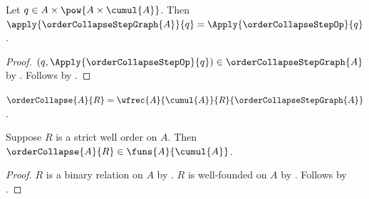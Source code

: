 \begin{proposition}\label{order_collapse_step_graph_application}
    Let $q\in A\times\pow{A\times\cumul{A}}$.
    Then
        $\apply{\orderCollapseStepGraph{A}}{q}
            =\Apply{\orderCollapseStepOp}{q}$.
\end{proposition}
\begin{proof}
    $(q,\Apply{\orderCollapseStepOp}{q})
        \in\orderCollapseStepGraph{A}$
        by
        .
    Follows by
        .
\end{proof}

\begin{definition}\label{order_collapse}
    $\orderCollapse{A}{R}=
        \wfrec{A}{\cumul{A}}{R}{\orderCollapseStepGraph{A}}$.
\end{definition}

\begin{proposition}\label{order_collapse_type}
    Suppose $R$ is a strict well order on $A$.
    Then $\orderCollapse{A}{R}\in\funs{A}{\cumul{A}}$.
\end{proposition}
\begin{proof}
    $R$ is a binary relation on $A$
        by
        .
    $R$ is well-founded on $A$
        by .
    Follows by
        .
\end{proof}

